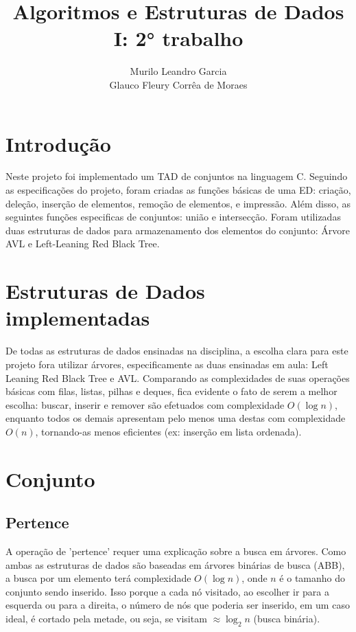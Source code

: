 \documentclass{article}
\title{Algoritmos e Estruturas de Dados I: 2° trabalho}
\author{
    Murilo Leandro Garcia \\ 
    Glauco Fleury Corrêa de Moraes
}
\date{}
\begin{document}
\maketitle

\section{Introdução}

Neste projeto foi implementado um TAD de conjuntos na linguagem C. Seguindo as especificações do projeto,
foram criadas as funções básicas de uma ED: criação, deleção, inserção de elementos, remoção de elementos, 
e impressão. Além disso, as seguintes funções especificas de conjuntos: união e intersecção. Foram utilizadas 
duas estruturas de dados para armazenamento dos elementos do conjunto: Árvore AVL e Left-Leaning Red Black Tree.

\section{Estruturas de Dados implementadas}

 De todas as estruturas de dados ensinadas na disciplina, a escolha clara para este projeto fora utilizar árvores,
especificamente as duas ensinadas em aula: Left Leaning Red Black Tree e AVL. Comparando as complexidades de suas
operações básicas com filas, listas, pilhas e deques, fica evidente o fato de serem a melhor escolha: buscar, inserir
e remover são efetuados com complexidade $O(\log n)$, enquanto todos os demais apresentam pelo menos uma destas com
complexidade $O(n)$, tornando-as menos eficientes (ex: inserção em lista ordenada).

\section{Conjunto}
\subsection{Pertence}
A operação de 'pertence' requer uma explicação sobre a busca em árvores. Como ambas as estruturas de dados são baseadas
em árvores binárias de busca (ABB), a busca por um elemento terá complexidade $O(\log n)$, onde $n$ é o tamanho do conjunto 
sendo inserido. Isso porque a cada nó visitado, ao escolher ir para a esquerda ou para a direita, o número de nós que 
poderia ser inserido, em um caso ideal, é cortado pela metade, ou seja, se visitam $\approx \log_2 n$ (busca binária).
\end{document}
